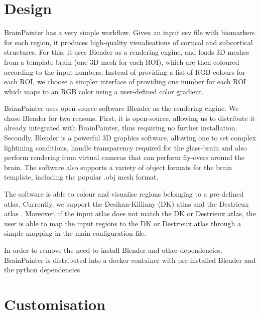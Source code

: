 \documentclass{llncs}
\begin{document}
\FloatBarrier
\section{Design}
\label{design}



BrainPainter has a very simple workflow. Given an input csv file with biomarkers for each region, it produces high-quality visualisations of cortical and subcortical structures. For this, it uses Blender as a rendering engine, and loads 3D meshes from a template brain (one 3D mesh for each ROI), which are then coloured according to the input numbers. Instead of providing a list of RGB colours for each ROI, we choose a simpler interface of providing one number for each ROI which maps to an RGB color using a user-defined color gradient. 

BrianPainter uses open-source software Blender \cite{blender2018} as the rendering engine. We chose Blender for two reasons. First, it is open-source, allowing us to distribute it already integrated with BrainPainter, thus requiring no further installation. Secondly, Blender is a powerful 3D graphics software, allowing one to set complex lightining conditions, handle transparency required for the glass-brain and also perform rendering from virtual cameras that can perform fly-overs around the brain. The software also supports a variety of object formats for the brain template, including the popular .obj mesh format.

The software is able to colour and visualise regions belonging to a pre-defined atlas. Currently, we support the Desikan-Killiany (DK) atlas \cite{desikan2006automated} and the Destrieux atlas \cite{destrieux2010automatic}. Moreover, if the input atlas does not match the DK or Destrieux atlas, the user is able to map the input regions to the DK or Destrieux atlas through a simple mapping in the main configuration file.  %

In order to remove the need to install Blender and other dependencies, BrainPainter is distributed into a docker container with pre-installed Blender and the python dependencies. 

\section{Customisation}
\label{customisation}
\end{document}
